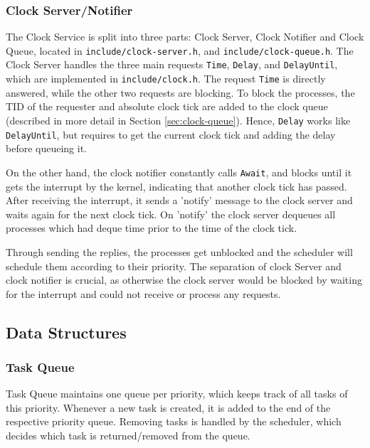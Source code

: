 \documentclass[12pt, titlepage]{article}
\begin{document}
    \subsubsection{Clock Server/Notifier}
    \label{sec:clock-server}
    The Clock Service is split into three parts: Clock Server, Clock Notifier and Clock Queue, located in \verb`include/clock-server.h`, and \verb`include/clock-queue.h`. 
    The Clock Server handles the three main requests \verb`Time`, \verb`Delay`, and \verb`DelayUntil`, which are implemented in \verb`include/clock.h`.
    The request \verb`Time` is directly answered, while the other two requests are blocking. 
    To block the processes, the TID of the requester and absolute clock tick are added to the clock queue (described in more detail in Section \ref{sec:clock-queue}). 
    Hence, \verb`Delay` works like \verb`DelayUntil`, but requires to get the current clock tick and adding the delay before queueing it. 

    On the other hand, the clock notifier constantly calls \verb`Await`, and blocks until it gets the interrupt by the kernel, indicating that another clock tick has passed. 
    After receiving the interrupt, it sends a 'notify' message to the clock server and waits again for the next clock tick. 
    On 'notify' the clock server dequeues all processes which had deque time prior to the time of the clock tick.

    Through sending the replies, the processes get unblocked and the scheduler will schedule them according to their priority. 
    The separation of clock Server and clock notifier is crucial, as otherwise the clock server would be blocked by waiting for the interrupt and could not receive or process any requests. 

    \subsection{Data Structures}

    \subsubsection{Task Queue}
    \label{sec:task-queue}

    Task Queue maintains one queue per priority, which keeps track of all tasks of this priority.
    Whenever a new task is created, it is added to the end of the respective priority queue.
    Removing tasks is handled by the scheduler, which decides which task is returned/removed from the queue.
\end{document}
